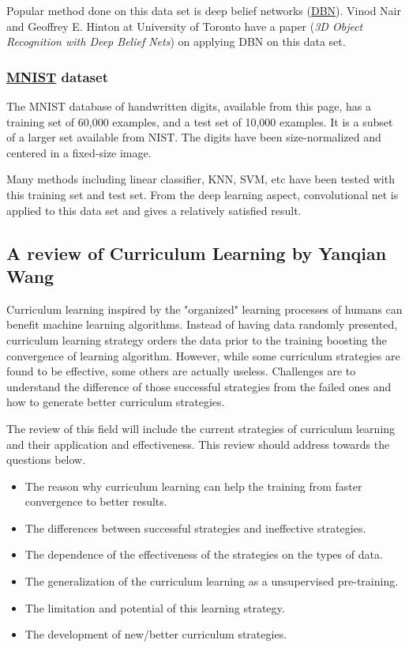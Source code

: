 \documentclass[11pt]{article}
\numberwithin{equation}{section}
\numberwithin{equation}{section}
\newcommand{\0}{{\mathbf{0}}}
\newcommand{\1}{{\mathbf{1}}}
\begin{document}
Popular method done on this data set is deep belief networks (\href{http://deeplearning.net/tutorial/DBN.html}{DBN}). Vinod Nair and Geoffrey E. Hinton at University of Toronto have a paper (\textit{3D Object Recognition with Deep Belief Nets}) on applying DBN on this data set.

\subsubsection{\href{http://yann.lecun.com/exdb/mnist/}{MNIST} dataset}
The MNIST database of handwritten digits, available from this page, has a training set of 60,000 examples, and a test set of 10,000 examples. It is a subset of a larger set available from NIST. The digits have been size-normalized and centered in a fixed-size image.

Many methods including linear classifier, KNN, SVM, etc have been tested with this training set and test set. From the deep learning aspect, convolutional net is applied to this data set and gives a relatively satisfied result. 


\subsection{A review of Curriculum Learning by Yanqian Wang}

Curriculum learning inspired by the "organized" learning processes of humans can benefit machine learning algorithms. Instead of having data randomly presented, curriculum learning strategy orders the data prior to the training boosting the convergence of learning algorithm. However, while some curriculum strategies are found to be effective, some others are actually useless. Challenges are to understand the difference of those successful strategies from the failed ones and how to generate better curriculum strategies. 

The review of this field will include the current strategies of curriculum learning and their application and effectiveness. 
This review should address towards the questions below.

\begin{itemize}
\item The reason why curriculum learning can help the training from faster convergence to better results.
\item The differences between successful strategies and ineffective strategies.
\item The dependence of the effectiveness of the strategies on the types of data.
\item The generalization of the curriculum learning as a unsupervised pre-training.
\item The limitation and potential of this learning strategy.
\item The development of new/better curriculum strategies.
\end{itemize}
\end{document}
